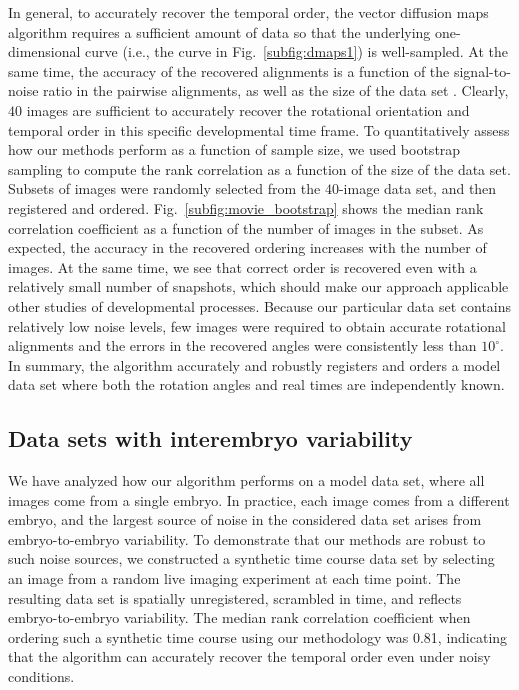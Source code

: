 \documentclass{pnastwo}
\newcommand{\fig}[0]{Fig.}
\begin{document}
\begin{article}
In general, to accurately recover the temporal order, the vector diffusion maps algorithm requires a sufficient amount of data so that the underlying one-dimensional curve (i.e., the curve in \fig~\ref{subfig:dmaps1}) is well-sampled.
%
At the same time, the accuracy of the recovered alignments is a function of the signal-to-noise ratio in the pairwise alignments, as well as the size of the data set \cite{singer2011angular}.
%
Clearly, $40$ images are sufficient to accurately recover the rotational orientation and temporal order in this specific developmental time frame.
%
To quantitatively assess how our methods perform as a function of sample size, we used bootstrap sampling to compute the rank correlation as a function of the size of the data set.
%
Subsets of images were randomly selected from the $40$-image data set, and then registered and ordered. 
%
\fig~\ref{subfig:movie_bootstrap} shows the median rank correlation coefficient as a function of the number of images in the subset.
%
As expected, the accuracy in the recovered ordering increases with the number of images. 
% 
At the same time, we see that correct order is recovered even with a relatively small number of snapshots, which should make our approach applicable other studies of developmental processes.
%
Because our particular data set contains relatively low noise levels, few images were required to obtain accurate rotational alignments and the errors in the recovered angles were consistently less than $10^{\circ}$.
%
In summary, the algorithm accurately and robustly registers and orders a model data set where both the rotation angles and real times are independently known. 


\subsection{Data sets with interembryo variability}

We have analyzed how our algorithm performs on a model data set, where all images come from a single embryo. 
%
In practice, each image comes from a different embryo, and the largest source of noise in the considered data set arises from embryo-to-embryo variability.
%
To demonstrate that our methods are robust to such noise sources,
we constructed a synthetic time course data set by selecting an image from a random live imaging experiment at each time point.
%
The resulting data set is spatially unregistered, scrambled in time, and reflects embryo-to-embryo variability. 
%
The median rank correlation coefficient when ordering such a synthetic time course using our methodology was 0.81, indicating that the algorithm can accurately recover the temporal order even under noisy conditions. 


\end{article}
\end{document}
